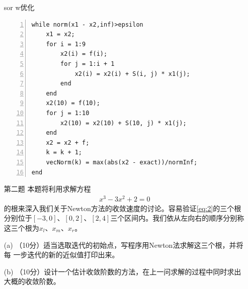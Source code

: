\documentclass[12pt,a4paper,UTF8]{ctexart}
\begin{document}
\begin{enumerate}
sor w优化
\begin{lstlisting}[frame=single,numbers=left]    
while norm(x1 - x2,inf)>epsilon
    x1 = x2;
    for i = 1:9
        x2(i) = f(i);
        for j = 1:i + 1
            x2(i) = x2(i) + S(i, j) * x1(j);
        end
    end
    x2(10) = f(10);
    for j = 1:10
        x2(10) = x2(10) + S(10, j) * x1(j);
    end
    x2 = x2 + f;
    k = k + 1;
    vecNorm(k) = max(abs(x2 - exact))/normInf;
end
\end{lstlisting}


	\item[第二题]
	本题将利用求解方程
	\begin{eqnarray}\label{eq:2}
		x^3-3x^2+2=0
	\end{eqnarray}
	的根来深入我们关于Newton方法的收敛速度的讨论。容易验证\eqref{eq:2}的三个根分别位于$[-3,0]$、$[0,2]$、$[2,4]$三个区间内。我们依从左向右的顺序分别称这三个根为$x_l$、$x_m$、$x_r$。

	(a) （10分）适当选取迭代的初始点，写程序用Newton法求解这三个根，并将每
一步迭代的新的近似值打印出来。

	(b) （10分）设计一个估计收敛阶数的方法，在上一问求解的过程中同时求出大概的收敛阶数。


\end{enumerate}
\end{document}
